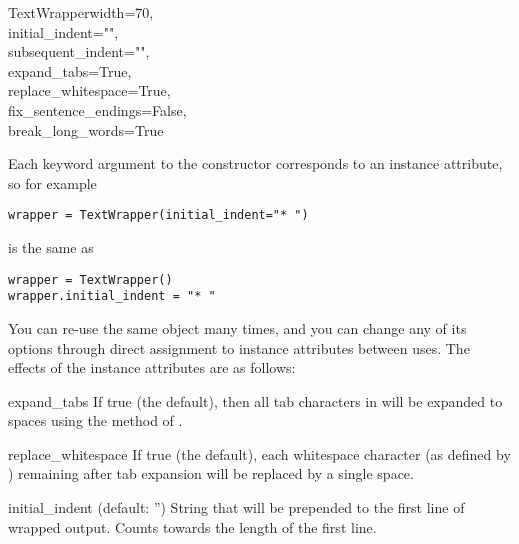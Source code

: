 \begin{classdesc}{TextWrapper}{width=70, \\
                               initial_indent="", \\
                               subsequent_indent="", \\
                               expand_tabs=True, \\
                               replace_whitespace=True, \\
                               fix_sentence_endings=False, \\
                               break_long_words=True}

Each keyword argument to the constructor corresponds to an instance
attribute, so for example
\begin{verbatim}
wrapper = TextWrapper(initial_indent="* ")
\end{verbatim}
is the same as
\begin{verbatim}
wrapper = TextWrapper()
wrapper.initial_indent = "* "
\end{verbatim}

You can re-use the same  object many times, and you
can change any of its options through direct assignment to instance
attributes between uses.  The effects of the instance attributes are as
follows:

\begin{memberdesc}[bool]{expand_tabs}
If true (the default), then all tab characters in  will be
expanded to spaces using the  method of
.
\end{memberdesc}

\begin{memberdesc}[bool]{replace_whitespace}
If true (the default), each whitespace character (as defined by
) remaining after tab expansion will be replaced
by a single space.  
\end{memberdesc}

\begin{memberdesc}[string]{initial_indent}
(default: '') String that will be prepended to the first line of wrapped
output.  Counts towards the length of the first line.
\end{memberdesc}


\end{classdesc}
